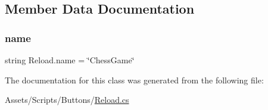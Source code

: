 \subsection{Member Data Documentation}
\mbox{\label{class_reload_a1c7abc2a97caa3db3217948dcd0f3da5}} 
\subsubsection{\texorpdfstring{name}{name}}
{\footnotesize\ttfamily string Reload.\+name = \char`\"{}Chess\+Game\char`\"{}}



The documentation for this class was generated from the following file\+:\begin{DoxyCompactItemize}
\item 
Assets/\+Scripts/\+Buttons/\mbox{\hyperlink{_reload_8cs}{Reload.\+cs}}\end{DoxyCompactItemize}
